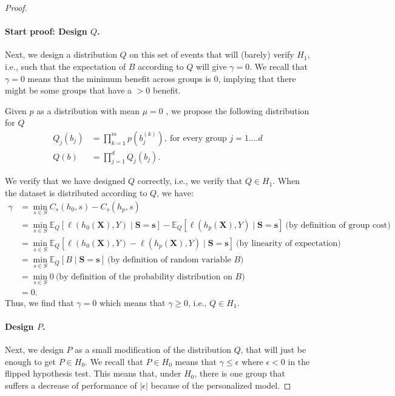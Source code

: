 \begin{proof}
\paragraph{Start proof: Design $Q$.} Next, we design a distribution $Q$ on this set of events that will (barely) verify $H_1$, i.e., such that the expectation of $B$ according to $Q$ will give $\gamma = 0$. We recall that $\gamma = 0$ means that the minimum benefit across groups is $0$, implying that there might be some groups that have a $>0$ benefit.

Given $p$ as a distribution with mean $\mu = 0$ , we propose the following distribution for $Q$
\begin{align*}
    Q_j(b_j) 
        &= \prod_{k=1}^m p(b_j^{(k)}),~\text{for every group $j=1....d$}\\
    Q(b) 
        &= \prod_{j=1}^d Q_j(b_j).
\end{align*}

We verify that we have designed $Q$ correctly, i.e., we verify that $Q \in H_1$. When the dataset is distributed according to $Q$, we have:
\begin{align*}
    \gamma 
        &= \min_{s \in S} C_{s}(h_0, s) - C_{s}(h_p, s)\\
        &= \min_{s \in S} 
            \mathbb{E}_Q[\ell(h_0(\mathbf{X}), Y) \mid \mathbf{S}=\mathbf{s}] 
            - \mathbb{E}_Q[\ell(h_p(\mathbf{X}), Y) \mid \mathbf{S}=\mathbf{s}] 
            ~\text{(by definition of group cost)}\\
        &= \min_{s \in S} 
            \mathbb{E}_Q[\ell(h_0(\mathbf{X}), Y) - \ell(h_p(\mathbf{X}), Y) \mid \mathbf{S}=\mathbf{s}] 
            ~\text{(by linearity of expectation)}\\
        &= \min_{s \in S} 
            \mathbb{E}_Q[B \mid \mathbf{S}=\mathbf{s}]
            ~\text{(by definition of random variable $B$)}\\
        &= \min_{s \in S} 
            0
            ~\text{(by definition of the probability distribution on $B$)}\\
        &= 0.
\end{align*}
Thus, we find that $\gamma =0$ which means that $\gamma \geq 0$, i.e., $Q \in H_1$.

\paragraph{Design $P$.} Next, we design $P$ as a small modification of the distribution $Q$, that will just be enough to get $P \in H_0$. We recall that $P \in H_0$ means that $\gamma \leq \epsilon$ where $\epsilon < 0$ in the flipped hypothesis test. This means that, under $H_0$, there is one group that suffers a decrease of performance of $|\epsilon|$ because of the personalized model.


\end{proof}
